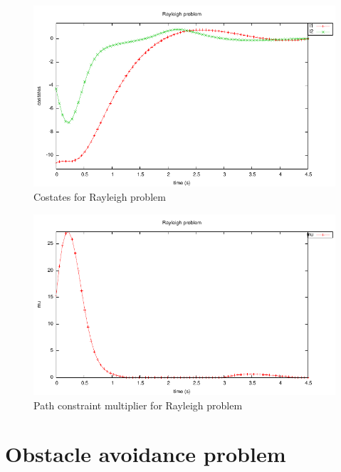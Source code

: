 \documentclass[a4paper,11pt]{report}    %
\begin{document}
\begin{figure}
  \centering 
  \includegraphics{../examples/rayleigh/rayleigh_costates.pdf}
  \caption{Costates for Rayleigh problem}
 \label{fig:rayleigh_costates}
\end{figure}

\begin{figure}
  \centering 
  \includegraphics{../examples/rayleigh/rayleigh_mu.pdf}
  \caption{Path constraint multiplier for Rayleigh problem}
 \label{fig:rayleigh_mu}
\end{figure}


\section{Obstacle avoidance problem}
\end{document}
